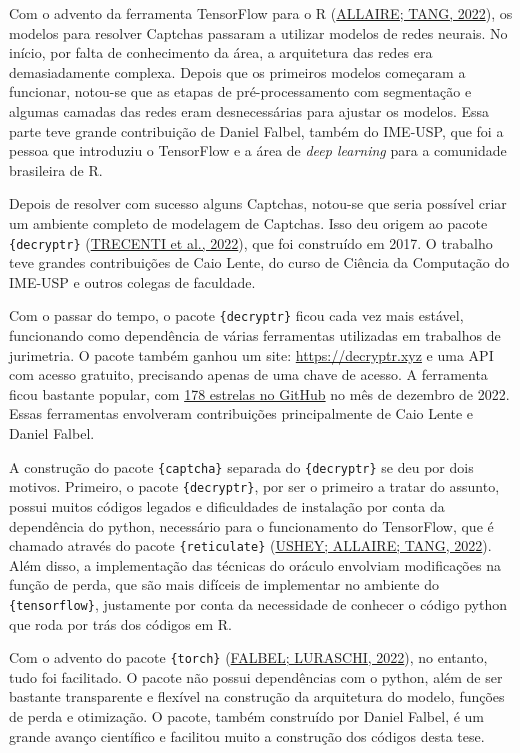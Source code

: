 \documentclass[12pt,twoside,brazilian]{book}
\begin{document}
Com o advento da ferramenta TensorFlow para o R
(\protect\hyperlink{ref-tensorflow}{ALLAIRE; TANG, 2022}), os modelos
para resolver Captchas passaram a utilizar modelos de redes neurais. No
início, por falta de conhecimento da área, a arquitetura das redes era
demasiadamente complexa. Depois que os primeiros modelos começaram a
funcionar, notou-se que as etapas de pré-processamento com segmentação e
algumas camadas das redes eram desnecessárias para ajustar os modelos.
Essa parte teve grande contribuição de Daniel Falbel, também do IME-USP,
que foi a pessoa que introduziu o TensorFlow e a área de \emph{deep
learning} para a comunidade brasileira de R.

Depois de resolver com sucesso alguns Captchas, notou-se que seria
possível criar um ambiente completo de modelagem de Captchas. Isso deu
origem ao pacote \texttt{\{decryptr\}}
(\protect\hyperlink{ref-decryptr}{TRECENTI et al., 2022}), que foi
construído em 2017. O trabalho teve grandes contribuições de Caio Lente,
do curso de Ciência da Computação do IME-USP e outros colegas de
faculdade.

Com o passar do tempo, o pacote \texttt{\{decryptr\}} ficou cada vez
mais estável, funcionando como dependência de várias ferramentas
utilizadas em trabalhos de jurimetria. O pacote também ganhou um site:
\url{https://decryptr.xyz} e uma API com acesso gratuito, precisando
apenas de uma chave de acesso. A ferramenta ficou bastante popular, com
\href{https://github.com/decryptr/decryptr}{178 estrelas no GitHub} no
mês de dezembro de 2022. Essas ferramentas envolveram contribuições
principalmente de Caio Lente e Daniel Falbel.

A construção do pacote \texttt{\{captcha\}} separada do
\texttt{\{decryptr\}} se deu por dois motivos. Primeiro, o pacote
\texttt{\{decryptr\}}, por ser o primeiro a tratar do assunto, possui
muitos códigos legados e dificuldades de instalação por conta da
dependência do python, necessário para o funcionamento do TensorFlow,
que é chamado através do pacote \texttt{\{reticulate\}}
(\protect\hyperlink{ref-reticulate}{USHEY; ALLAIRE; TANG, 2022}). Além
disso, a implementação das técnicas do oráculo envolviam modificações na
função de perda, que são mais difíceis de implementar no ambiente do
\texttt{\{tensorflow\}}, justamente por conta da necessidade de conhecer
o código python que roda por trás dos códigos em R.

Com o advento do pacote \texttt{\{torch\}}
(\protect\hyperlink{ref-torch}{FALBEL; LURASCHI, 2022}), no entanto,
tudo foi facilitado. O pacote não possui dependências com o python, além
de ser bastante transparente e flexível na construção da arquitetura do
modelo, funções de perda e otimização. O pacote, também construído por
Daniel Falbel, é um grande avanço científico e facilitou muito a
construção dos códigos desta tese.
\end{document}
